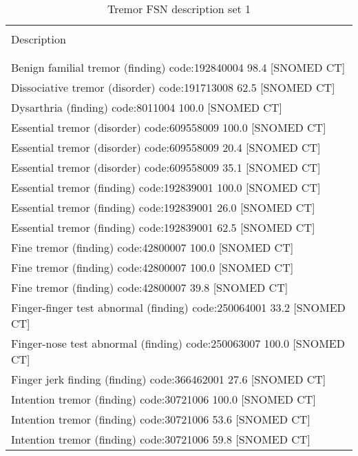 \documentclass[10pt, letterpaper]{article}
\begin{document}
\begin{spacing}{1.0}
\vspace{10pt}

\begin{footnotesize}
\begin{longtable}[H]{l}
    \caption{Tremor FSN description set 1}\\[-4pt]
    \hline\\[-6pt]
    Description\\[2pt]
    \hline\\[-4pt]
    \endhead
        [XOther specified forms of tremor (finding) code:194473001 43.8 [SNOMED CT]\\
        Benign familial tremor (finding) code:192840004 98.4 [SNOMED CT]\\
        Dissociative tremor (disorder) code:191713008 62.5 [SNOMED CT]\\
        Dysarthria (finding) code:8011004 100.0 [SNOMED CT]\\
        Essential tremor (disorder) code:609558009 100.0 [SNOMED CT]\\
        Essential tremor (disorder) code:609558009 20.4 [SNOMED CT]\\
        Essential tremor (disorder) code:609558009 35.1 [SNOMED CT]\\
        Essential tremor (finding) code:192839001 100.0 [SNOMED CT]\\
        Essential tremor (finding) code:192839001 26.0 [SNOMED CT]\\
        Essential tremor (finding) code:192839001 62.5 [SNOMED CT]\\
        Fine tremor (finding) code:42800007  100.0 [SNOMED CT]\\
        Fine tremor (finding) code:42800007 100.0 [SNOMED CT]\\
        Fine tremor (finding) code:42800007 39.8 [SNOMED CT]\\
        Finger-finger test abnormal (finding) code:250064001 33.2 [SNOMED CT]\\
        Finger-nose test abnormal (finding) code:250063007 100.0 [SNOMED CT]\\
        Finger jerk finding (finding) code:366462001 27.6 [SNOMED CT]\\
        Intention tremor (finding) code:30721006 100.0 [SNOMED CT]\\
        Intention tremor (finding) code:30721006 53.6 [SNOMED CT]\\
        Intention tremor (finding) code:30721006 59.8 [SNOMED CT]\\

\end{longtable}
\end{footnotesize}
\end{spacing}
\end{document}
